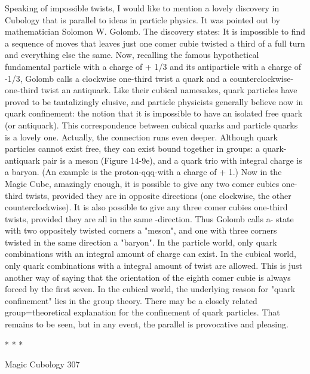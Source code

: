          Speaking of impossible twists, I would like to mention a lovely discovery in
Cubology that is parallel to ideas in particle physics. It was pointed out by
mathematician Solomon W. Golomb. The discovery states: It is impossible to find a
sequence of moves that leaves just one comer cubie twisted a third of a full turn and
everything else the same. Now, recalling the famous hypothetical fundamental
particle with a charge of + 1/3 and its antiparticle with a charge of -1/3, Golomb calls
a clockwise one-third twist a quark and a counterclockwise- one-third twist an
antiquark. Like their cubical namesakes, quark particles have proved to be
tantalizingly elusive, and particle physicists generally believe now in quark
confinement: the notion that it is impossible to have an isolated free quark (or
antiquark). This correspondence between cubical quarks and particle quarks is a
lovely one.
         Actually, the connection runs even deeper. Although quark particles cannot
exist free, they can exist bound together in groups: a quark-antiquark pair is a meson
(Figure 14-9e), and a quark trio with integral charge is a baryon. (An example is the
proton-qqq-with a charge of + 1.) Now in the Magic Cube, amazingly enough, it is
possible to give any two comer cubies one-third twists, provided they are in opposite
directions (one clockwise, the other counterclockwise). It is also possible to give any
three comer cubies one-third twists, provided they are all in the same -direction. Thus
Golomb calls a- state with two oppositely twisted corners a "meson", and one with
three corners twisted in the same direction a "baryon". In the particle world, only
quark combinations with an integral amount of charge can exist. In the cubical world,
only quark combinations with a integral amount of twist are allowed. This is just
another way of saying that the orientation of the eighth comer cubie is always forced
by the first seven. In the cubical world, the underlying reason for "quark confinement"
lies in the group theory. There may be a closely related group=theoretical explanation
for the confinement of quark particles. That remains to be seen, but in any event, the
parallel is provocative and pleasing.

                                       *   *   *




Magic Cubology                                                                      307

